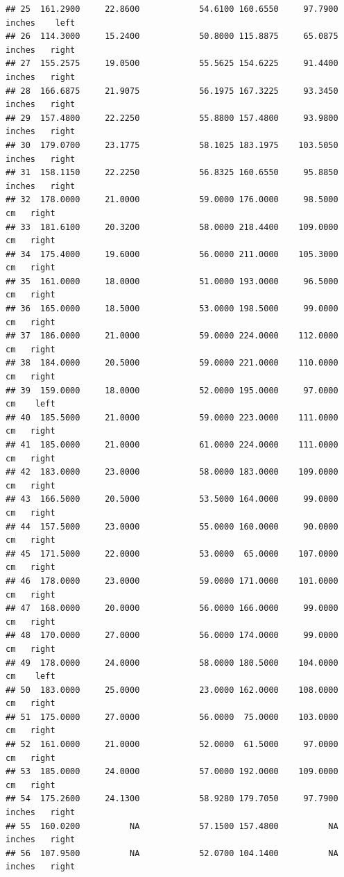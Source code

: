 \documentclass[]{article}
\begin{document}
\begin{verbatim}
## 25  161.2900     22.8600            54.6100 160.6550     97.7900 inches    left
## 26  114.3000     15.2400            50.8000 115.8875     65.0875 inches   right
## 27  155.2575     19.0500            55.5625 154.6225     91.4400 inches   right
## 28  166.6875     21.9075            56.1975 167.3225     93.3450 inches   right
## 29  157.4800     22.2250            55.8800 157.4800     93.9800 inches   right
## 30  179.0700     23.1775            58.1025 183.1975    103.5050 inches   right
## 31  158.1150     22.2250            56.8325 160.6550     95.8850 inches   right
## 32  178.0000     21.0000            59.0000 176.0000     98.5000     cm   right
## 33  181.6100     20.3200            58.0000 218.4400    109.0000     cm   right
## 34  175.4000     19.6000            56.0000 211.0000    105.3000     cm   right
## 35  161.0000     18.0000            51.0000 193.0000     96.5000     cm   right
## 36  165.0000     18.5000            53.0000 198.5000     99.0000     cm   right
## 37  186.0000     21.0000            59.0000 224.0000    112.0000     cm   right
## 38  184.0000     20.5000            59.0000 221.0000    110.0000     cm   right
## 39  159.0000     18.0000            52.0000 195.0000     97.0000     cm    left
## 40  185.5000     21.0000            59.0000 223.0000    111.0000     cm   right
## 41  185.0000     21.0000            61.0000 224.0000    111.0000     cm   right
## 42  183.0000     23.0000            58.0000 183.0000    109.0000     cm   right
## 43  166.5000     20.5000            53.5000 164.0000     99.0000     cm   right
## 44  157.5000     23.0000            55.0000 160.0000     90.0000     cm   right
## 45  171.5000     22.0000            53.0000  65.0000    107.0000     cm   right
## 46  178.0000     23.0000            59.0000 171.0000    101.0000     cm   right
## 47  168.0000     20.0000            56.0000 166.0000     99.0000     cm   right
## 48  170.0000     27.0000            56.0000 174.0000     99.0000     cm   right
## 49  178.0000     24.0000            58.0000 180.5000    104.0000     cm    left
## 50  183.0000     25.0000            23.0000 162.0000    108.0000     cm   right
## 51  175.0000     27.0000            56.0000  75.0000    103.0000     cm   right
## 52  161.0000     21.0000            52.0000  61.5000     97.0000     cm   right
## 53  185.0000     24.0000            57.0000 192.0000    109.0000     cm   right
## 54  175.2600     24.1300            58.9280 179.7050     97.7900 inches   right
## 55  160.0200          NA            57.1500 157.4800          NA inches   right
## 56  107.9500          NA            52.0700 104.1400          NA inches   right

\end{verbatim}
\end{document}
